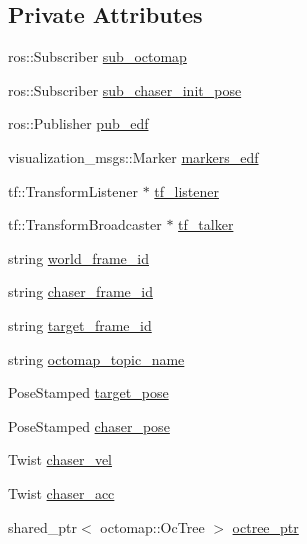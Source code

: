 \subsection*{Private Attributes}
\begin{DoxyCompactItemize}
\item 
ros\+::\+Subscriber \hyperlink{class_objects_handler_a3b384ae3f8f66557b1c1ac04523fb330}{sub\+\_\+octomap}
\item 
ros\+::\+Subscriber \hyperlink{class_objects_handler_a9a2e098b85260b71c88b81dadd6ca58a}{sub\+\_\+chaser\+\_\+init\+\_\+pose}
\item 
ros\+::\+Publisher \hyperlink{class_objects_handler_a86a1f98983b533f77bf17867affb5251}{pub\+\_\+edf}
\item 
visualization\+\_\+msgs\+::\+Marker \hyperlink{class_objects_handler_ad6904dcaaad790234569760df0fb0ac2}{markers\+\_\+edf}
\item 
tf\+::\+Transform\+Listener $\ast$ \hyperlink{class_objects_handler_aea45bba31aa769008386100725bda66b}{tf\+\_\+listener}
\item 
tf\+::\+Transform\+Broadcaster $\ast$ \hyperlink{class_objects_handler_af49de4eabb124e2ee6c9e12ebb31bca3}{tf\+\_\+talker}
\item 
string \hyperlink{class_objects_handler_a1c0586ae7467bb8a3df8ad247ac7b10b}{world\+\_\+frame\+\_\+id}
\item 
string \hyperlink{class_objects_handler_a3e8d08bf5d76d69f1768b53fd799953c}{chaser\+\_\+frame\+\_\+id}
\item 
string \hyperlink{class_objects_handler_a7a616768386c4c7da9af4da3d07bd936}{target\+\_\+frame\+\_\+id}
\item 
string \hyperlink{class_objects_handler_a70b5e252a180d919653c7b53aff6f534}{octomap\+\_\+topic\+\_\+name}
\item 
Pose\+Stamped \hyperlink{class_objects_handler_ad436bfd8b262f473f0e4ca92b3c3402b}{target\+\_\+pose}
\item 
Pose\+Stamped \hyperlink{class_objects_handler_a79fd5f872a40cca5ea599f1e83dcb3ad}{chaser\+\_\+pose}
\item 
Twist \hyperlink{class_objects_handler_a74e3f3b4bf263711c389190a595368e2}{chaser\+\_\+vel}
\item 
Twist \hyperlink{class_objects_handler_a36db60068ada56b9142b3d6ef0437749}{chaser\+\_\+acc}
\item 
shared\+\_\+ptr$<$ octomap\+::\+Oc\+Tree $>$ \hyperlink{class_objects_handler_a76ad7ca7513755408c02dd36dea94c6e}{octree\+\_\+ptr}
\item 

\end{DoxyCompactItemize}
